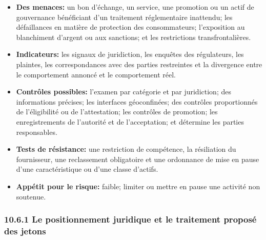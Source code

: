 \documentclass[11pt]{article}
\begin{document}
\begin{itemize}[leftmargin=*]
\item \textbf{Des menaces:} un bon d'échange, un service, une promotion ou un actif de gouvernance bénéficiant d'un traitement réglementaire inattendu; les défaillances en matière de protection des consommateurs; l'exposition au blanchiment d'argent ou aux sanctions; et les restrictions transfrontalières.
\item \textbf{Indicateurs:} les signaux de juridiction, les enquêtes des régulateurs, les plaintes, les correspondances avec des parties restreintes et la divergence entre le comportement annoncé et le comportement réel.
\item \textbf{Contrôles possibles:} l'examen par catégorie et par juridiction; des informations précises; les interfaces géoconfinées; des contrôles proportionnés de l'éligibilité ou de l'attestation; les contrôles de promotion; les enregistrements de l'autorité et de l'acceptation; et détermine les parties responsables.
\item \textbf{Tests de résistance:} une restriction de compétence, la résiliation du fournisseur, une reclassement obligatoire et une ordonnance de mise en pause d'une caractéristique ou d'une classe d'actifs.
\item \textbf{Appétit pour le risque:} faible; limiter ou mettre en pause une activité non soutenue.
\end{itemize}
\subsubsection*{10.6.1 Le positionnement juridique et le traitement proposé des jetons}
\end{document}
